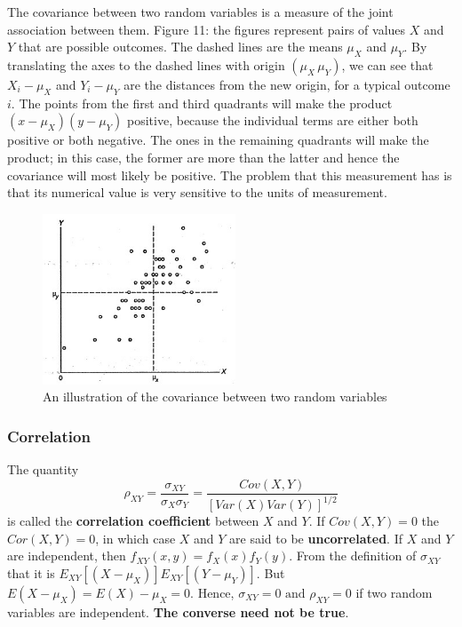 \documentclass{article}
\begin{document}
The covariance between two random variables is a measure of the joint association between them. Figure 11: the figures represent pairs of values \(X\) and \(Y\) that are possible outcomes. The dashed lines are the means \(\mu_X\) and \(\mu_Y\). By translating the axes to the dashed lines with origin \((\mu_X\,\mu_Y)\), we can see that \(X_i-\mu_X\) and \(Y_i-\mu_Y\) are the distances from the new origin, for a typical outcome \(i\). The points from the first and third quadrants will make the product \((x-\mu_X)(y-\mu_Y)\) positive, because the individual terms are either both positive or both negative. The ones in the remaining quadrants will make the product; in this case, the former are more than the latter and hence the covariance will most likely be positive. The problem that this measurement has is that its numerical value is very sensitive to the units of measurement.

\begin{figure} [H]
    \centering
    \includegraphics[height=2in]{pics/cov.jpg}
    \caption{An illustration of the covariance between two random variables}
    \label{fig:enter-label15}
\end{figure}

\subsubsection{Correlation}

The quantity
\begin{equation*}
    \rho_{XY}=\frac{\sigma_{XY}}{\sigma_{X}\sigma_{Y}}=\frac{Cov(X,Y)}{[Var(X)Var(Y)]^{1/2}}
\end{equation*}
is called the \textbf{correlation coefficient} between \(X\) and \(Y\). If \(Cov(X,Y)=0\) the \(Cor(X,Y)=0\), in which case \(X\) and \(Y\) are said to be \textbf{uncorrelated}. If \(X\) and \(Y\) are independent, then \(f_{XY}(x,y)=f_X(x)f_Y(y)\). From the definition of \(\sigma_{XY}\) that it is \(E_{XY}[(X-\mu_X)]E_{XY}[(Y-\mu_Y)]\). But \(E(X-\mu_X)=E(X)-\mu_X=0\). Hence, \(\sigma_{XY}=0 \text{ and } \rho_{XY}=0\) if two random variables are independent. \textbf{The converse need not be true}.
\end{document}
